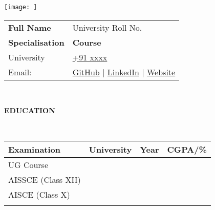 \documentclass[a4paper,10pt]{article}
\newcommand{\resheading}[1]{{\small \colorbox{mygrey}{\begin{minipage}{0.99\textwidth}{\textbf{#1
\vphantom{p\^{E}}}}\end{minipage}}}}
\renewcommand{\arraystretch}{1}
\begin{document}
\selectfont


\begin{table}
    \begin{minipage}{0.15\linewidth}
        \centering
        \texttt{[image: ]}
    \end{minipage}
    \begin{minipage}{0.65\linewidth}
        \setlength{\tabcolsep}{50pt}
        \def\arraystretch{1.15}
        \begin{tabular}{ll}
            \textbf{\Large{Full Name}}  &  {University Roll No.} \\
            \textbf{Specialisation} & \textbf{Course} \\
            University &  {\href{tel:91 xxxx}{+91 xxxx}}\\
            Email:  & \href{}{GitHub} | \href{}{LinkedIn} | \href{}{Website} \\
        \end{tabular} \\ [-0.5cm]
    \end{minipage}\hfill
\end{table} 

\setlength{\tabcolsep}{20 pt}
\noindent
\begin{table}
\centering
\noindent
\resheading{\textbf{EDUCATION}}\\[+0.1cm]
\begin{tabular}{llll}
\toprule
\textbf{Examination}    & \textbf{University}    & \textbf{Year}     & \textbf{CGPA/\%} \\ 
\toprule
UG Course \\ 
AISSCE (Class XII) \\ 
AISCE (Class X) \\ 
\bottomrule \\[-1.35cm]
\end{tabular}
\end{table}
\end{document}
